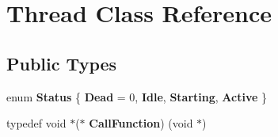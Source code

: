 \hypertarget{structThread}{}\section{Thread Class Reference}
\label{structThread}
\subsection*{Public Types}
\begin{DoxyCompactItemize}
\item 
\hypertarget{structThread_a8ede7df4c0d779fa21d1c66809ed8ba4}{}enum {\bfseries Status} \{ {\bfseries Dead} = 0, 
{\bfseries Idle}, 
{\bfseries Starting}, 
{\bfseries Active}
 \}\label{structThread_a8ede7df4c0d779fa21d1c66809ed8ba4}

\item 
\hypertarget{structThread_ab87d2aa8cc76167c2895f953bf412c70}{}typedef void $\ast$($\ast$ {\bfseries Call\+Function}) (void $\ast$)\label{structThread_ab87d2aa8cc76167c2895f953bf412c70}

\end{DoxyCompactItemize}
